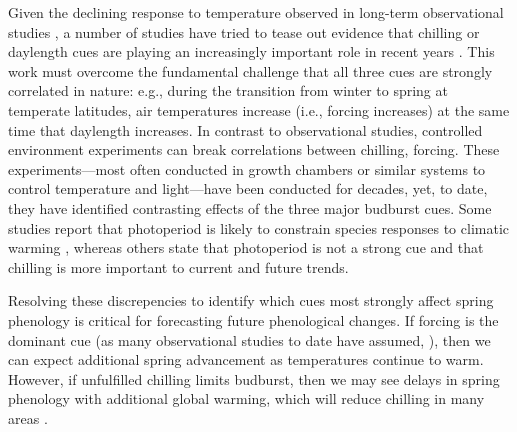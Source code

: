 \documentclass{article}
\begin{document}
\par Given the declining response to temperature observed in long-term observational studies \citep{fu2015}, a number of studies have tried to tease out evidence that chilling or daylength cues are playing an increasingly important role in recent years \citep{Basler:2014aa,zohner2016, Laube:2014a}. This work must overcome the fundamental challenge that all three cues are strongly correlated in nature: e.g., during the transition from winter to spring at temperate latitudes, air temperatures increase (i.e., forcing increases) at the same time that daylength increases. In contrast to observational studies, controlled environment experiments can break correlations between chilling, forcing. These experiments---most often conducted in growth chambers or similar systems to control temperature and light---have been conducted for decades, yet, to date, they have identified contrasting effects of the three major budburst cues. Some studies report that photoperiod is likely to constrain species responses to climatic warming \citep{Basler:2012, Caffarra:2011b,Caffarra:2011a}, whereas others state that photoperiod is not a strong cue \citep{zohner2016,Laube:2014a} and that chilling is more important to current and future trends. 

\par Resolving these discrepencies to identify which cues most strongly affect spring phenology is critical for forecasting future phenological changes. If forcing is the dominant cue (as many observational studies to date have assumed, \citep{bradley1999,menzel2006,harrington2015}), then we can expect additional spring advancement as temperatures continue to warm. However, if unfulfilled chilling limits budburst, then we may see delays in spring phenology with additional global warming, which will reduce chilling in many areas \citep{fraga2019}. 
\end{document}
